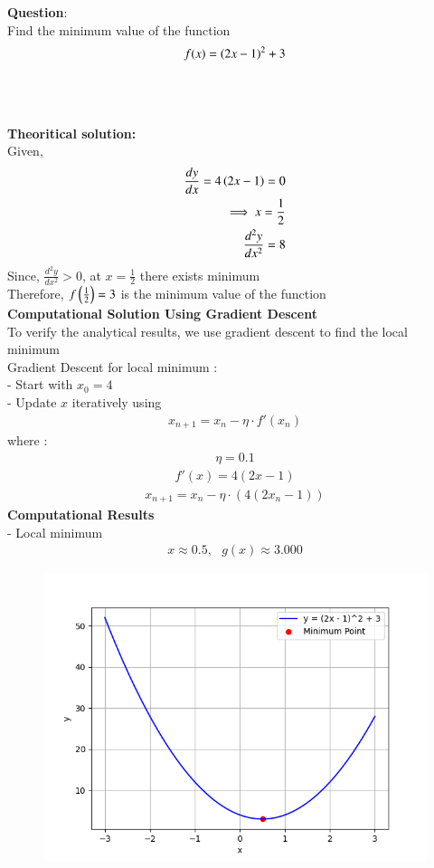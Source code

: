 \documentclass[journal]{IEEEtran}
\begin{document}
\textbf{Question}:\\
Find the minimum value of the function\\
$$f(x)=\left(2x-1\right)^2+3$$\\
\solution \\
\\
\textbf{Theoritical solution:}\\
Given,\\
\begin{align}
    \frac{dy}{dx}=4\left(2x-1\right)=0\\
    \implies x=\frac{1}{2}\\
    \frac{d^2y}{dx^2}=8\\
\end{align}
Since, $\frac{d^2y}{dx^2}>0$, at $x=\frac{1}{2}$ there exists minimum  \\
Therefore, $f\left(\frac{1}{2}\right)=3$ is the minimum value of the function\\
\textbf{Computational Solution Using Gradient Descent} \\
To verify the analytical results, we use gradient descent to find the local minimum \\
Gradient Descent for local minimum : \\ 
 - Start with $x_0 = 4$ \\
 - Update $x$ iteratively using 
\begin{align}
    x_{n+1} = x_n - \eta \cdot f'(x_n)
\end{align}
where :
\begin{align}
    \eta = 0.1 
\end{align}
\begin{align}
    f'(x) = 4(2x-1) 
\end{align}
\begin{align}
    x_{n+1} = x_n - \eta \cdot (4(2x_n-1))
\end{align}
\textbf{Computational Results} \\
 - Local minimum 
 \begin{align}
     x \approx 0.5,\text{ } g(x) \approx 3.000
 \end{align} 
 \begin{figure}[ht!]
   \centering
   \includegraphics[width=\columnwidth]{figs/Figure_1.png}
\end{figure}
\end{document}
